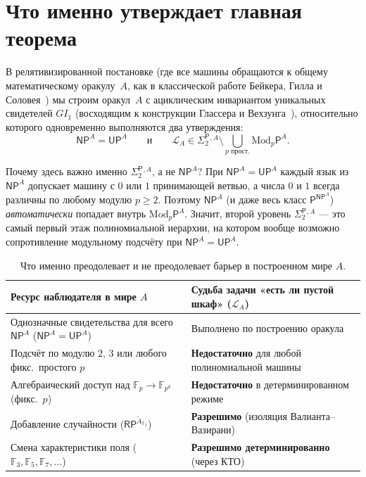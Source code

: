 \documentclass[11pt,a4paper]{article}
\newcommand{\Pcl}{\mathsf{P}}
\newcommand{\NP}{\mathsf{NP}}
\newcommand{\UP}{\mathsf{UP}}
\newcommand{\RP}{\mathsf{RP}}
\newcommand{\Modp}{\mathrm{Mod}_p\mathsf{P}}
\newcommand{\SigTwo}{\Sigma_2^{\mathsf{P}}}
\newcommand{\F}{\mathbb{F}}
\newcommand{\GI}{GI_1}
\begin{document}
\section{Что именно утверждает главная теорема}

В релятивизированной постановке (где все машины обращаются к общему математическому оракулу~$A$, как в классической работе Бейкера, Гилла и Соловея~\cite{BakerGillSolovay1975}) мы строим оракул~$A$ с ациклическим инвариантом уникальных свидетелей $\GI$ (восходящим к конструкции Глассера и Вехзунга~\cite{GlasserWechsung2003}), относительно которого одновременно выполняются два утверждения:
\[
  \NP^A = \UP^A
  \qquad\text{и}\qquad
  \mathcal{L}_A \in \SigTwo{}^{,A} \setminus \bigcup_{p\text{ прост.}} \Modp^A.
\]

Почему здесь важно именно $\SigTwo{}^{,A}$, а не $\NP^A$? При $\NP^A = \UP^A$ каждый язык из $\NP^A$ допускает машину с $0$ или $1$ принимающей ветвью, а числа $0$ и $1$ всегда различны по любому модулю $p \ge 2$. Поэтому $\NP^A$ (и даже весь класс $\Pcl^{\NP^A}$) \emph{автоматически} попадает внутрь $\Modp^A$. Значит, второй уровень $\SigTwo{}^{,A}$ — это самый первый этаж полиномиальной иерархии, на котором вообще возможно сопротивление модульному подсчёту при $\NP^A = \UP^A$.

\begin{table}[!htbp]
\centering
\begin{tabularx}{\linewidth}{lX}
\toprule
\textbf{Ресурс наблюдателя в мире $A$} & \textbf{Судьба задачи «есть ли пустой шкаф» ($\mathcal{L}_A$)} \\
\midrule
Однозначные свидетельства для всего $\NP^A$ ($\NP^A = \UP^A$) & Выполнено по построению оракула \\
Подсчёт по модулю $2$, $3$ или любого фикс.\ простого $p$ & \textbf{Недостаточно} для любой полиномиальной машины \\
Алгебраический доступ над $\F_p \to \F_{p^k}$ (фикс.\ $p$) & \textbf{Недостаточно} в детерминированном режиме \\
Добавление случайности ($\RP^{\widetilde{A}_{\F_3}}$) & \textbf{Разрешимо} (изоляция Валианта--Вазирани) \\
Смена характеристики поля ($\F_3, \F_5, \F_7, \dots$) & \textbf{Разрешимо детерминированно} (через КТО) \\
\bottomrule
\end{tabularx}
\caption{Что именно преодолевает и не преодолевает барьер в построенном мире $A$.}
\end{table}
\end{document}
